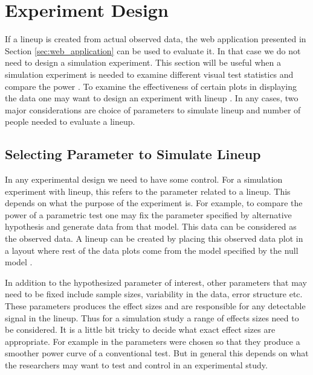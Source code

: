 \documentclass[11pt]{article}
\begin{document}
\section{Experiment Design} \label{sec:turk_exp}

If a lineup is created from actual observed data, the web application presented in Section \ref{sec:web_application} can be used to evaluate it. In that case we do not need to design a simulation experiment. This section will be useful when a simulation experiment is needed to examine different visual test statistics and compare the power \citep{majumder:2013}. To examine the effectiveness of certain plots in displaying the data one may want to design an experiment with lineup \citep{heike:2012}. In any cases, two major considerations are choice of parameters to simulate lineup and number of people needed to evaluate a lineup.

\subsection{Selecting Parameter to Simulate Lineup} \label{sec:parameter_selection} In any experimental design we need to have some control. For a simulation experiment with lineup, this refers to the parameter related to a lineup. This depends on what the purpose of the experiment is. For example, to compare the power of a parametric test one may fix the parameter specified by alternative hypothesis and generate data from that model. This data can be considered as the observed data. A lineup can be created by placing this observed data plot in a layout where rest of the data plots come from the model specified by the null model \citep{majumder:2013}. 

In addition to the hypothesized parameter of interest, other parameters that may need to be fixed include sample sizes, variability in the data, error structure etc. These parameters produces the effect sizes and are responsible for any detectable signal in the lineup. Thus for a simulation study a range of effects sizes need to be considered. It is a little bit tricky to decide what exact effect sizes are appropriate. For example in \cite{majumder:2013} the parameters were chosen so that they produce a smoother power curve of a conventional test. But in general this depends on what the researchers may want to test and control in an experimental study.

\end{document}
